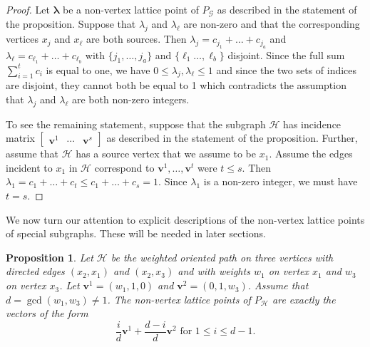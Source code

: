 \documentclass [12pt,a4paper,reqno]{amsart}
\theoremstyle{plain}
\newtheorem{Proposition}[Theorem]{Proposition}
\theoremstyle{definition}
\newtheorem{Assumptions and Discussion}[Theorem]{Assumptions and Discussion}
\theoremstyle{remark}
\newcommand\bfv{\mathbf{v}}
\newcommand\bflam{\boldsymbol{\lambda}}
\newcommand\calG{\mathcal{G}}
\newcommand\calH{\mathcal{H}}
\begin{document}
\begin{proof}
Let $\bflam$ be a non-vertex lattice point of $P_\calG$ as described in the statement of the proposition. Suppose that $\lambda_j$ and $\lambda_{\ell}$ are non-zero and that the corresponding vertices $x_j$ and $x_{\ell}$ are both sources.  Then $\lambda_j = c_{j_1}+\dots+c_{j_a}$ and $\lambda_{\ell} = c_{\ell_1}+\dots+c_{\ell_b}$ with $\{j_1, \dots, j_a\}$ and $\{\ell_1\dots, \ell_b\}$ disjoint.  Since the full sum $\sum_{i = 1}^t c_i$ is equal to one, we have $0\leq \lambda_j, \lambda_{\ell} \leq 1$ and since the two sets of indices are disjoint, they cannot both be equal to 1 which contradicts the assumption that $\lambda_j$ and $\lambda_{\ell}$ are both non-zero integers.

To see the remaining statement, suppose that the subgraph $\calH$ has incidence matrix $\begin{bmatrix}\bfv^1&\cdots&\bfv^s\end{bmatrix}$ as described in the statement of the proposition. Further, assume that $\calH$ has a source vertex that we assume to be $x_1$. Assume the edges incident to $x_1$ in $\calH$ correspond to $\bfv^1,\dots,\bfv^t$ were $t\leq s$. 
Then $\lambda_1 = c_1+\dots +c_{t} \leq c_1+\dots +c_s = 1$. Since $\lambda_1$ is a non-zero integer, we must have $t = s$.
\end{proof}

We now turn our attention to explicit descriptions of the non-vertex lattice points of special subgraphs.  These will be needed in later sections.


\begin{Proposition}\label{NonvertexK12}
Let $\calH$ be the weighted oriented path on three vertices with directed edges $(x_2, x_1)$ and $(x_2, x_3)$ and with weights $w_1$ on vertex $x_1$ and $w_3$ on vertex $x_3$.  Let $\mathbf{v}^1 = (w_1, 1, 0)$ and $\mathbf{v}^2 = (0,1,w_3)$.  Assume that $d = \gcd(w_1, w_3) \neq 1$.  The non-vertex lattice points of $P_\calH$ are exactly the vectors of the form
\[
    \frac{i}{d}\mathbf{v}^1+\frac{d-i}{d}\mathbf{v}^2\text{ for }1\leq i\leq d-1.
\]
\end{Proposition}
\end{document}
